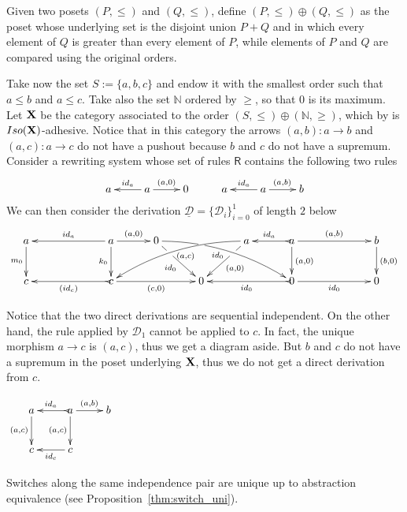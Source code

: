\documentclass[a4paper,UKenglish,cleveref,pdftex, thm-restate,numberwithinsect,anonymous]{lipics}
\newcommand{\id}[1]{\mathsf{id}_{#1}}
\def\R{\mathsf{R}}
\def\X{\textbf {\textup{X}}}
\newcommand{\dder}[1]{\mathscr{#1}}
\newcommand{\der}[1]{\underline{\dder{#1}}}
\begin{document}
\begin{example}
  \label{ex:diff1}
  Given two posets $(P, \leq)$ and $(Q, \leq)$, define
  $(P, \leq)\oplus(Q,\leq)$ as the poset whose underlying set is
  the disjoint union $P+Q$ and in which every element of $Q$ is
  greater than every element of $P$, while elements of $P$ and $Q$ are
  compared using the original orders.

  Take now the set $S:=\{a,b,c\}$ and endow it with the smallest order
  such that $a\leq b$ and $a\leq c$.  Take also the set $\mathbb{N}$
  ordered by $\geq$, so that $0$ is its maximum.  Let $\X$ be the
  category associated to the order
  $(S, \leq)\oplus (\mathbb{N}, \geq)$, which by  is
  $\mathsf{Iso(\X)}$-adhesive. Notice that in this category the arrows
  $(a,b)\colon a\to b$ and $(a,c)\colon a\to c$ do not have a pushout
  because $b$ and $c$ do not have a supremum.  Consider a rewriting
  system whose set of rules $\R$ contains the following two rules
  \[\xymatrix{a & a \ar[r]^{(a, 0)} \ar[l]_{\id{a}} & 0 & a & a
      \ar[r]^{(a, b)} \ar[l]_{\id{a}} & b }\]
  We can then consider the  derivation
  $\der{D}=\{\dder{D}_i\}_{i=0}^1$ of length $2$ below
  \[
    \xymatrix@C=30pt{a \ar[d]_{m_0}&& a \ar[d]_{k_0}\ar[ll]_{\id{a}}
      \ar[r]^{(a,0)} & 0 \ar@/^.35cm/[drrr]|(.315)\hole_(.45){\id{0}}
      \ar[dr]|(.3)\hole_{\id{0}} && a \ar@/_.35cm/[dlll]^(.45){(a,c)}
      \ar[dl]|(.3)\hole^{(a,0)}& a \ar[d]^{(a,0)}\ar@{>->}[l]_{\id{a}}
      \ar[rr]^{(a,b)} && b \ar[d]^{(b,0)}\\c &&
      \ar@{>->}[ll]^{(\id{c})} c \ar[rr]_{(c,0)}&& 0 &&
      \ar@{>->}[ll]^{\id{0}} 0 \ar[rr]_{\id{0}}&& 0}\]

  \noindent
  \parbox{10cm}{ \hspace{15pt} Notice that the two
    direct derivations are sequential independent.
    On the other hand, the rule
    applied by $\dder{D}_1$ cannot be applied to $c$. In fact, the
    unique morphism $a\to c$ is $(a,c)$, thus we get a diagram
    aside. But $b$ and $c$ do not have a supremum in the poset
    underlying $\X$, thus we do not get a direct derivation from
    $c$.}  \parbox{3cm}{
    \vspace{-.3cm}$\xymatrix{a \ar[d]_{(a,c)}& a
      \ar[d]_{(a,c)}\ar@{>->}[l]_{\id{a}} \ar[r]^{(a,b)} & b \\c
      & c \ar[l]^{\id{c}} }$}  
\end{example}

\iffalse 

Switches along the same independence pair are unique up to abstraction
equivalence (see Proposition~\ref{thm:switch_uni}).
\end{document}
